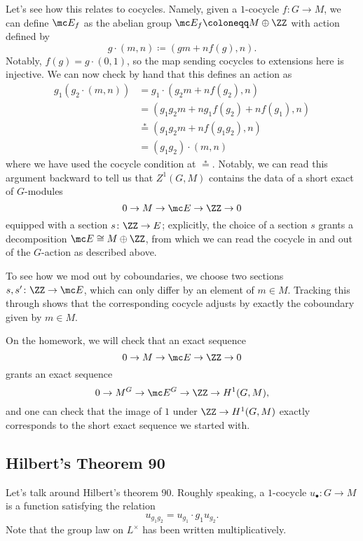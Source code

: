 \documentclass[../notes.tex]{subfiles}
\begin{document}
Let's see how this relates to cocycles. Namely, given a $1$-cocycle $f\colon G\to M$, we can define $\mc E_f$ as the abelian group $\mc E_f\coloneqq M\oplus\ZZ$ with action defined by
\[g\cdot(m,n)\coloneqq(gm+nf(g),n).\]
Notably, $f(g)=g\cdot(0,1)$, so the map sending cocycles to extensions here is injective. We can now check by hand that this defines an action as
\begin{align*}
	g_1(g_2\cdot(m,n)) &= g_1\cdot(g_2m+nf(g_2),n) \\
	&= (g_1g_2m+ng_1f(g_2)+nf(g_1),n) \\
	&\stackrel*= (g_1g_2m+nf(g_1g_2),n) \\
	&= (g_1g_2)\cdot(m,n)
\end{align*}
where we have used the cocycle condition at $\stackrel*=$. Notably, we can read this argument backward to tell us that $Z^1(G,M)$ contains the data of a short exact of $G$-modules
\[0\to M\to\mc E\to\ZZ\to0\]
equipped with a section $s\colon\ZZ\to E$; explicitly, the choice of a section $s$ grants a decomposition $\mc E\cong M\oplus\ZZ$, from which we can read the cocycle in and out of the $G$-action as described above.

To see how we mod out by coboundaries, we choose two sections $s,s'\colon\ZZ\to\mc E$, which can only differ by an element of $m\in M$. Tracking this through shows that the corresponding cocycle adjusts by exactly the coboundary given by $m\in M$.
\begin{remark}
	On the homework, we will check that an exact sequence
	\[0\to M\to\mc E\to\ZZ\to0\]
	grants an exact sequence
	\[0\to M^G\to\mc E^G\to\ZZ\to H^1(G,M),\]
	and one can check that the image of $1$ under $\ZZ\to H^1(G,M)$ exactly corresponds to the short exact sequence we started with.
\end{remark}

\subsection{Hilbert's Theorem 90}
Let's talk around Hilbert's theorem 90. Roughly speaking, a $1$-cocycle $u_\bullet\colon G\to M$ is a function satisfying the relation
\[u_{g_1g_2}=u_{g_1}\cdot g_1u_{g_2}.\]
Note that the group law on $L^\times$ has been written multiplicatively.
\end{document}

